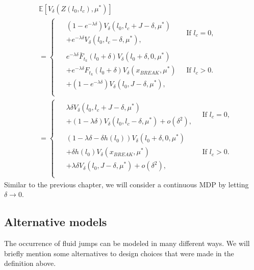 \begin{equation}\label{eq:SimpleFluidNextState}
\begin{split}
&\mathbb{E}[V_\delta(Z(l_0,l_c),\mu^*)]\\
&=\begin{cases}
\begin{split}
&(1-e^{-\lambda \delta})V_\delta(l_0,l_c+J-\delta,\mu^*)\\
&+e^{-\lambda \delta}V_\delta(l_0,l_c-\delta,\mu^*),
\end{split}&\ \text{If $l_c=0$,}\\
\begin{split}
&e^{-\lambda \delta} \bar{F}_{t_k}(l_0+\delta)V_\delta(l_0+\delta,0,\mu^*)\\
&+ e^{-\lambda \delta}F_{t_k}(l_0+\delta)V_\delta(x_{BREAK},\mu^*)\\
&+(1-e^{-\lambda \delta})V_\delta(l_0,J-\delta,\mu^*),
\end{split}&\ \text{If $l_c>0$.}\\
\end{cases}\\
&=\begin{cases}
\begin{split}
&\lambda\delta V_\delta(l_0,l_c+J-\delta,\mu^*)\\
&+(1-\lambda \delta)V_\delta(l_0,l_c-\delta,\mu^*)+o(\delta^2),
\end{split}
&\ \text{If $l_c=0$,}\\
\begin{split}
&(1-\lambda \delta-\delta h(l_0))V_\delta(l_0+\delta,0,\mu^*)\\
&+ \delta h(l_0)V_\delta(x_{BREAK},\mu^*)\\
&+\lambda \delta V_\delta(l_0,J-\delta,\mu^*)+o(\delta^2),
\end{split}&\ \text{If $l_c>0$.}\\
\end{cases}
\end{split}
\end{equation}
Similar to the previous chapter, we will consider a continuous MDP by letting $\delta\rightarrow0$.

\subsection{Alternative models}
The occurrence of fluid jumps can be modeled in many different ways.
We will briefly mention some alternatives to design choices that were made in the definition above.
